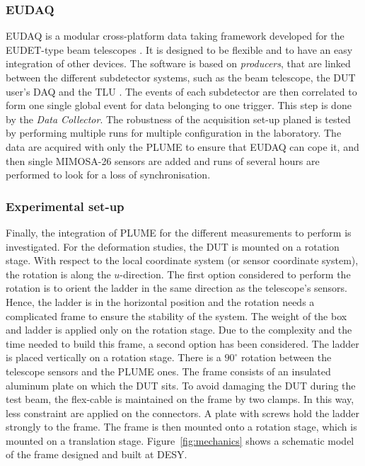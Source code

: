       \subsubsection{EUDAQ}

      EUDAQ is a modular cross-platform data taking framework developed for the EUDET-type beam telescopes \cite{Jansen}.
      It is designed to be flexible and to have an easy integration of other devices.
      The software is based on \textit{producers}, that are linked between the different subdetector systems, such as the beam telescope, the \gls{DUT} user's DAQ and the \gls{TLU} \cite{Cussans2009}.
      The events of each subdetector are then correlated to form one single global event for data belonging to one trigger.
      This step is done by the \textit{Data Collector}.
      The robustness of the acquisition set-up planed is tested by performing multiple runs for multiple configuration in the laboratory.
      The data are acquired with only the \gls{PLUME} to ensure that EUDAQ can cope it, and then single \gls{MIMOSA}-26 sensors are added and runs of several hours are performed to look for a loss of synchronisation.

      \subsubsection{Experimental set-up}

      Finally, the integration of \gls{PLUME} for the different measurements to perform is investigated.
      For the deformation studies, the \gls{DUT} is mounted on a rotation stage. 
      With respect to the local coordinate system (or sensor coordinate system), the rotation is along the $u$-direction. 
      The first option considered to perform the rotation is to orient the ladder in the same direction as the telescope's sensors. 
      Hence, the ladder is in the horizontal position and the rotation needs a complicated frame to ensure the stability of the system.
      The weight of the box and ladder is applied only on the rotation stage. 
      Due to the complexity and the time needed to build this frame, a second option has been considered.
      The ladder is placed vertically on a rotation stage. 
      There is a $90^{\circ}$ rotation between the telescope sensors and the \gls{PLUME} ones.
      The frame consists of an insulated aluminum plate on which the \gls{DUT} sits.
      To avoid damaging the \gls{DUT} during the test beam, the flex-cable is maintained on the frame by two clamps.
      In this way, less constraint are applied on the connectors. 
      A plate with screws hold the ladder strongly to the frame.
      The frame is then mounted onto a rotation stage, which is mounted on a translation stage.
      Figure~\ref{fig:mechanics} shows a schematic model of the frame designed and built at DESY.
      
